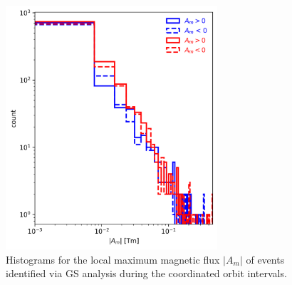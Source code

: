 \begin{figure}
    \centering
    \includegraphics[width=0.7\textwidth]{Figures/Histograms/Asplit_coordinated.png}
    \caption[Histogram of poloidal magnetic ﬂux per unit length from coordinated analysis]{Histograms for the local maximum magnetic flux $|A_m|$ of events identified via GS analysis during the coordinated orbit intervals.} %
    \label{fig:histogram-Asplit-coordinated}
\end{figure}


